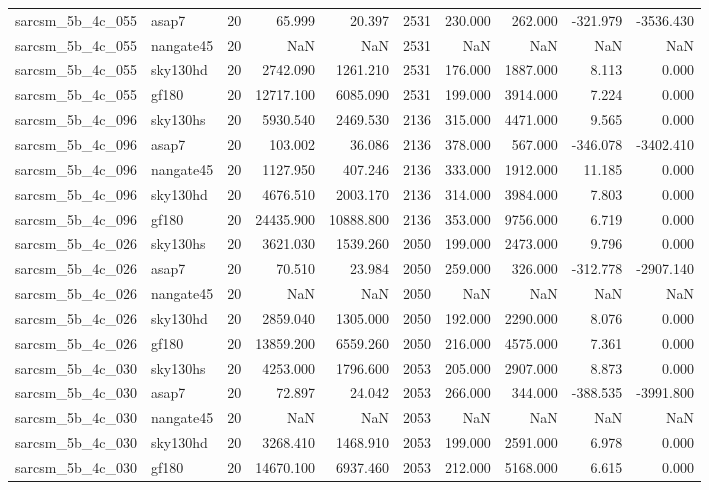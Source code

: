\begin{tabular}{llrrrrrrrr}
sarcsm\_5b\_4c\_055 & asap7 & 20 & 65.999 & 20.397 & 2531 & 230.000 & 262.000 & -321.979 & -3536.430 \\
sarcsm\_5b\_4c\_055 & nangate45 & 20 & NaN & NaN & 2531 & NaN & NaN & NaN & NaN \\
sarcsm\_5b\_4c\_055 & sky130hd & 20 & 2742.090 & 1261.210 & 2531 & 176.000 & 1887.000 & 8.113 & 0.000 \\
sarcsm\_5b\_4c\_055 & gf180 & 20 & 12717.100 & 6085.090 & 2531 & 199.000 & 3914.000 & 7.224 & 0.000 \\
sarcsm\_5b\_4c\_096 & sky130hs & 20 & 5930.540 & 2469.530 & 2136 & 315.000 & 4471.000 & 9.565 & 0.000 \\
sarcsm\_5b\_4c\_096 & asap7 & 20 & 103.002 & 36.086 & 2136 & 378.000 & 567.000 & -346.078 & -3402.410 \\
sarcsm\_5b\_4c\_096 & nangate45 & 20 & 1127.950 & 407.246 & 2136 & 333.000 & 1912.000 & 11.185 & 0.000 \\
sarcsm\_5b\_4c\_096 & sky130hd & 20 & 4676.510 & 2003.170 & 2136 & 314.000 & 3984.000 & 7.803 & 0.000 \\
sarcsm\_5b\_4c\_096 & gf180 & 20 & 24435.900 & 10888.800 & 2136 & 353.000 & 9756.000 & 6.719 & 0.000 \\
sarcsm\_5b\_4c\_026 & sky130hs & 20 & 3621.030 & 1539.260 & 2050 & 199.000 & 2473.000 & 9.796 & 0.000 \\
sarcsm\_5b\_4c\_026 & asap7 & 20 & 70.510 & 23.984 & 2050 & 259.000 & 326.000 & -312.778 & -2907.140 \\
sarcsm\_5b\_4c\_026 & nangate45 & 20 & NaN & NaN & 2050 & NaN & NaN & NaN & NaN \\
sarcsm\_5b\_4c\_026 & sky130hd & 20 & 2859.040 & 1305.000 & 2050 & 192.000 & 2290.000 & 8.076 & 0.000 \\
sarcsm\_5b\_4c\_026 & gf180 & 20 & 13859.200 & 6559.260 & 2050 & 216.000 & 4575.000 & 7.361 & 0.000 \\
sarcsm\_5b\_4c\_030 & sky130hs & 20 & 4253.000 & 1796.600 & 2053 & 205.000 & 2907.000 & 8.873 & 0.000 \\
sarcsm\_5b\_4c\_030 & asap7 & 20 & 72.897 & 24.042 & 2053 & 266.000 & 344.000 & -388.535 & -3991.800 \\
sarcsm\_5b\_4c\_030 & nangate45 & 20 & NaN & NaN & 2053 & NaN & NaN & NaN & NaN \\
sarcsm\_5b\_4c\_030 & sky130hd & 20 & 3268.410 & 1468.910 & 2053 & 199.000 & 2591.000 & 6.978 & 0.000 \\
sarcsm\_5b\_4c\_030 & gf180 & 20 & 14670.100 & 6937.460 & 2053 & 212.000 & 5168.000 & 6.615 & 0.000 \\

\end{tabular}

